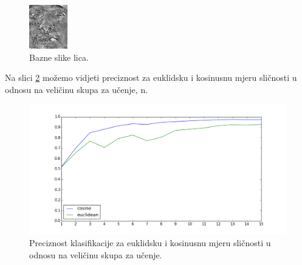 \documentclass[times, utf8, seminar, numeric]{fer}
\begin{document}
\begin{figure}[!htb]
\endminipage\hfill
{}%
  \includegraphics[width=\linewidth]{raw/base88.jpg}
\endminipage
\caption{Bazne slike lica.}\label{fig:base_images}
\end{figure}

Na slici \ref{fig:euc_cos_comp} možemo vidjeti preciznost za euklidsku i kosinusnu mjeru sličnosti u odnosu na veličinu skupa za učenje, n.

\begin{figure}[!htb]
\centering
\includegraphics[width=\textwidth]{raw/euc_cos_comp.png}
\caption{Preciznost klasifikacije za euklidsku i kosinusnu mjeru sličnosti u odnosu na veličinu skupa za učenje.}
\label{fig:euc_cos_comp}
\end{figure}
\end{document}
